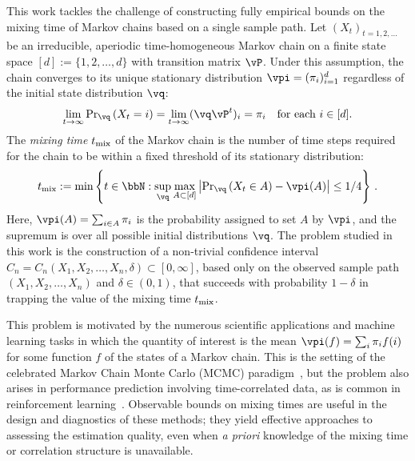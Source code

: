 This work
tackles the challenge of constructing
fully empirical bounds on the
mixing time of Markov chains based on a single sample path.
Let $(X_t)_{t=1,2,\dotsc}$ be an irreducible, aperiodic
time-homogeneous Markov chain on a finite state space $[d] :=
\{1,2,\dotsc,d\}$ with transition matrix $\vP$.
Under this assumption, the chain converges to its unique stationary
distribution $\vpi =
(\pi_i)_{i=1}^d$ regardless of the initial state distribution $\vq$: 
\[
  \lim_{t\to\infty} {\Pr}_{\vq}\Parens{X_t = i}
  = \lim_{t\to\infty} (\vq \vP^t)_i = \pi_i
  \quad \text{for each $i \in [d]$} .
\]
The \emph{mixing time} $t_{\operatorname{mix}}$ of the Markov chain is the
number of time steps required
for the chain to
be within a fixed threshold of
its stationary
distribution:
\begin{align}
\label{eq:mixtimedef}
  \tmix
  :=
  \min\Braces{
    t \in \bbN :
    \sup_{\vq}
    \max_{A\subset [d]}
    \Abs{
      \textstyle\Pr_{\vq}\Parens{ X_t \in A } - \vpi(A)
    }
    \leq 1/4
  }\,.
\end{align}
Here, $\vpi(A) = \sum_{i\in A} \pi_i$ is the probability assigned to
set $A$ by $\vpi$, and the supremum is over all possible initial
distributions $\vq$.
The problem studied in this work is the construction of a non-trivial
confidence interval $C_n = C_n(X_1,X_2,\dotsc,X_n,\delta) \subset
[0,\infty]$, based only on the observed sample path
$(X_1,X_2,\dotsc,X_n)$ and $\delta \in (0,1)$, that
succeeds with probability $1-\delta$
in trapping
the value of the
mixing time $t_{\operatorname{mix}}$.

This problem is motivated by the numerous scientific applications and
machine learning tasks in which
the quantity of interest is
the
mean $\vpi(f) = \sum_i \pi_i f(i)$
for some function $f$ of the states of
a Markov chain.
This is the setting of the celebrated Markov Chain Monte Carlo (MCMC)
paradigm~\cite{liu2001monte}, but the problem also arises in
performance prediction involving time-correlated data, as is common in
reinforcement learning~\cite{sutton98}.
Observable bounds on mixing times are useful in the design and
diagnostics of these methods; they yield effective approaches to
assessing the estimation quality, even when \emph{a priori} knowledge
of the mixing time or correlation structure is unavailable.

